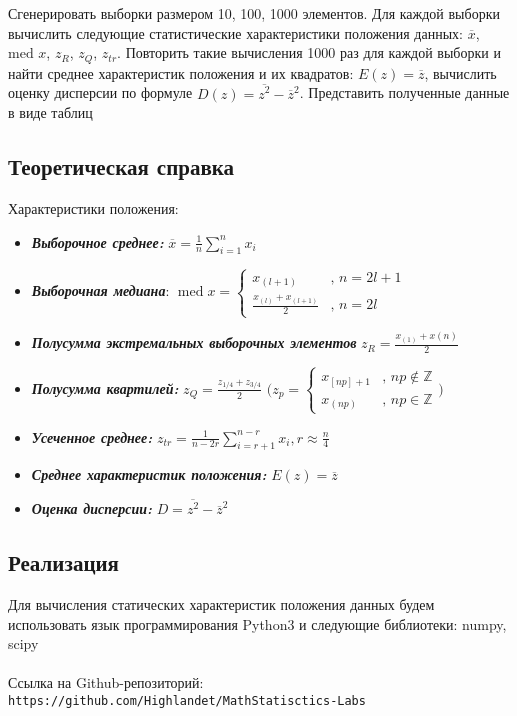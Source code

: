 \documentclass[14pt]{extarticle}
\DeclareMathOperator{\med}{med} %
\begin{document}
Сгенерировать выборки размером 10, 100, 1000 элементов. Для каждой выборки вычислить следующие статистические характеристики положения данных: \(\overline{x}\), \(\text{med }x\), \(z_R\), \(z_Q\), \(z_{tr}\). Повторить такие вычисления 1000 раз для каждой выборки и найти среднее характеристик положения и их квадратов: \(E(z)=\overline{z}\), вычислить оценку дисперсии по формуле \(D(z)=\overline{z^2}-\overline{z}^2\). Представить полученные данные в виде таблиц

\subsection{Теоретическая справка}

Характеристики положения:
\begin{itemize}
    \item \textbf{\textit{Выборочное среднее:}} \(\overline{x} = \frac{1}{n}\sum_{i=1}^n x_i\)
    \item \textbf{\textit{Выборочная медиана}}: \(\med{x} = \begin{cases} 
    x_{(l+1)}&\text{, } n=2l+1 \\
    \frac{x_{(l)}+x_{(l+1)}}{2}&\text{, } n=2l\end{cases}\)
    \item \textbf{\textit{Полусумма экстремальных выборочных элементов}} \(z_R=\frac{x_{(1)}+x{(n)}}{2}\)
    \item \textbf{\textit{Полусумма квартилей:}} \(z_Q=\frac{z_{1/4}+z_{3/4}}{2}\)   \(\big(z_p=\begin{cases} 
    x_{[np]+1}&\text{, } np\notin\mathbb{Z} \\
    x_{(np)}&\text{, } np\in\mathbb{Z}\end{cases}\big)\)
    \item \textbf{\textit{Усеченное среднее:}} \(z_{tr}=\frac{1}{n-2r}\sum_{i=r+1}^{n-r} x_i, r\approx\frac{n}{4}\)
    \item \textbf{\textit{Среднее характеристик положения:}} \(E(z)=\overline{z}\)
    \item \textbf{\textit{Оценка дисперсии:}} \(D=\overline{z^2}-\overline{z}^2\)
\end{itemize}

\subsection{Реализация}

Для вычисления статических характеристик положения данных будем использовать язык программирования Python3 и следующие библиотеки: numpy, scipy\\\\
Ссылка на Github-репозиторий:\\ \texttt{https://github.com/Highlandet/MathStatisctics-Labs}
\end{document}
